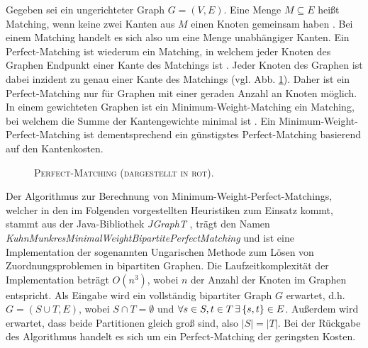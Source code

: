 Gegeben sei ein ungerichteter Graph $G = (V, E)$. Eine Menge $M \subseteq E$ heißt Matching,
wenn keine zwei Kanten aus $M$ einen Knoten gemeinsam haben \cite{Gibbons1985}. Bei einem Matching handelt es sich also
um eine Menge unabhängiger Kanten. Ein Perfect-Matching ist wiederum ein Matching, in welchem jeder Knoten des Graphen
Endpunkt einer Kante des Matchings ist \cite{Gibbons1985}. Jeder Knoten des Graphen ist dabei inzident zu genau einer Kante
des Matchings (vgl. Abb. \ref{fig:perfect_matching}).
Daher ist ein Perfect-Matching nur für Graphen mit einer geraden Anzahl an Knoten möglich.
In einem gewichteten Graphen ist ein Minimum-Weight-Matching ein Matching, bei welchem die Summe der Kantengewichte
minimal ist \cite{Gibbons1985}. Ein Minimum-Weight-Perfect-Matching ist dementsprechend ein günstigstes Perfect-Matching
basierend auf den Kantenkosten.

\begin{figure}[H]
\centering
{}
\caption{\textsc{Perfect-Matching (dargestellt in rot).}}
\label{fig:perfect_matching}
\end{figure}

Der Algorithmus zur Berechnung von Minimum-Weight-Perfect-Matchings, welcher in den im Folgenden
vorgestellten Heuristiken zum Einsatz kommt, stammt aus der Java-Bibliothek \textit{JGraphT} \cite{JGraphT}, trägt
den Namen \textit{KuhnMunkresMinimalWeightBipartitePerfectMatching} und ist eine Implementation der
sogenannten Ungarischen Methode zum Lösen von Zuordnungsproblemen in bipartiten Graphen.
Die Laufzeitkomplexität der Implementation beträgt $O(n^3)$, wobei $n$ der Anzahl der Knoten im Graphen entspricht.
Als Eingabe wird ein vollständig bipartiter Graph $G$ erwartet, d.h. $G= (S \cup T, E)$, wobei $S \cap T = \emptyset$ und
$\forall s \in S, t \in T \thinspace \exists \thinspace \{s, t\} \in E$. Außerdem wird erwartet, dass beide Partitionen gleich groß sind,
also $|S| = |T|$. Bei der Rückgabe des Algorithmus handelt es sich um ein Perfect-Matching der geringsten Kosten.

